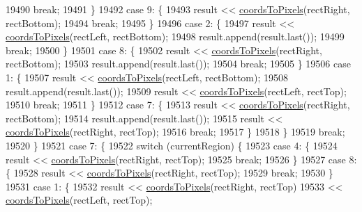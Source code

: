 \begin{DoxyCode}
19490       \textcolor{keywordflow}{break};
19491     \}
19492     \textcolor{keywordflow}{case} 9: \{
19493       result << \hyperlink{class_q_c_p_abstract_plottable_ade710a776104b14c1c835168ce1bfc5c}{coordsToPixels}(rectRight, rectBottom);
19494       \textcolor{keywordflow}{break};
19495     \}
19496     \textcolor{keywordflow}{case} 2: \{
19497       result << \hyperlink{class_q_c_p_abstract_plottable_ade710a776104b14c1c835168ce1bfc5c}{coordsToPixels}(rectLeft, rectBottom);
19498       result.append(result.last());
19499       \textcolor{keywordflow}{break};
19500     \}
19501     \textcolor{keywordflow}{case} 8: \{
19502       result << \hyperlink{class_q_c_p_abstract_plottable_ade710a776104b14c1c835168ce1bfc5c}{coordsToPixels}(rectRight, rectBottom);
19503       result.append(result.last());
19504       \textcolor{keywordflow}{break};
19505     \}
19506     \textcolor{keywordflow}{case} 1: \{
19507       result << \hyperlink{class_q_c_p_abstract_plottable_ade710a776104b14c1c835168ce1bfc5c}{coordsToPixels}(rectLeft, rectBottom);
19508       result.append(result.last());
19509       result << \hyperlink{class_q_c_p_abstract_plottable_ade710a776104b14c1c835168ce1bfc5c}{coordsToPixels}(rectLeft, rectTop);
19510       \textcolor{keywordflow}{break};
19511     \}
19512     \textcolor{keywordflow}{case} 7: \{
19513       result << \hyperlink{class_q_c_p_abstract_plottable_ade710a776104b14c1c835168ce1bfc5c}{coordsToPixels}(rectRight, rectBottom);
19514       result.append(result.last());
19515       result << \hyperlink{class_q_c_p_abstract_plottable_ade710a776104b14c1c835168ce1bfc5c}{coordsToPixels}(rectRight, rectTop);
19516       \textcolor{keywordflow}{break};
19517     \}
19518     \}
19519     \textcolor{keywordflow}{break};
19520   \}
19521   \textcolor{keywordflow}{case} 7: \{
19522     \textcolor{keywordflow}{switch} (currentRegion) \{
19523     \textcolor{keywordflow}{case} 4: \{
19524       result << \hyperlink{class_q_c_p_abstract_plottable_ade710a776104b14c1c835168ce1bfc5c}{coordsToPixels}(rectRight, rectTop);
19525       \textcolor{keywordflow}{break};
19526     \}
19527     \textcolor{keywordflow}{case} 8: \{
19528       result << \hyperlink{class_q_c_p_abstract_plottable_ade710a776104b14c1c835168ce1bfc5c}{coordsToPixels}(rectRight, rectTop);
19529       \textcolor{keywordflow}{break};
19530     \}
19531     \textcolor{keywordflow}{case} 1: \{
19532       result << \hyperlink{class_q_c_p_abstract_plottable_ade710a776104b14c1c835168ce1bfc5c}{coordsToPixels}(rectRight, rectTop)
19533              << \hyperlink{class_q_c_p_abstract_plottable_ade710a776104b14c1c835168ce1bfc5c}{coordsToPixels}(rectLeft, rectTop);

\end{DoxyCode}
